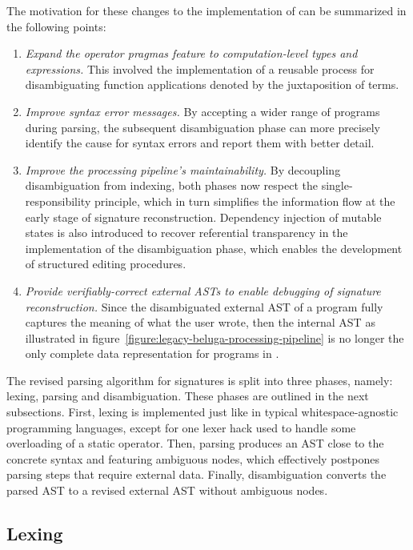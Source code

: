 The motivation for these changes to the implementation of \Beluga can be summarized in the following points:
\begin{enumerate}
\item
\textit{Expand the operator pragmas feature to computation-level types and expressions.}
This involved the implementation of a reusable process for disambiguating function applications denoted by the juxtaposition of terms.
\item
\textit{Improve syntax error messages.}
By accepting a wider range of programs during parsing, the subsequent disambiguation phase can more precisely identify the cause for syntax errors and report them with better detail.
\item
\textit{Improve the processing pipeline's maintainability.}
By decoupling disambiguation from indexing, both phases now respect the single-responsibility principle, which in turn simplifies the information flow at the early stage of signature reconstruction.
Dependency injection of mutable states is also introduced to recover referential transparency in the implementation of the disambiguation phase, which enables the development of structured editing procedures.
\item
\textit{Provide verifiably-correct external \acp{AST} to enable debugging of signature reconstruction.}
Since the disambiguated external \ac{AST} of a program fully captures the meaning of what the user wrote, then the internal \ac{AST} as illustrated in figure~\ref{figure:legacy-beluga-processing-pipeline} is no longer the only complete data representation for programs in \Beluga.
\end{enumerate}

The revised parsing algorithm for \Beluga signatures is split into three phases, namely: lexing, parsing and disambiguation.
These phases are outlined in the next subsections.
First, lexing is implemented just like in typical whitespace-agnostic programming languages, except for one lexer hack used to handle some overloading of a static operator.
Then, parsing produces an \ac{AST} close to the concrete syntax and featuring ambiguous nodes, which effectively postpones parsing steps that require external data.
Finally, disambiguation converts the parsed \ac{AST} to a revised external \ac{AST} without ambiguous nodes.

\subsection{Lexing}

